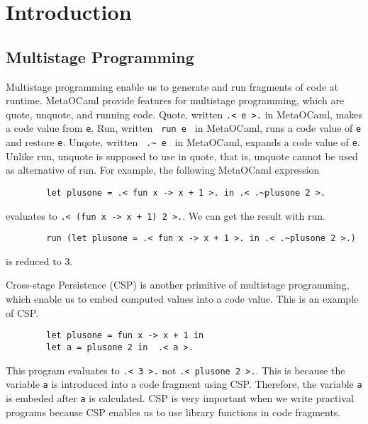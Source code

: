 \documentclass[runningheads]{llncs}
\begin{document}
\section{Introduction}

\subsection{Multistage Programming}


Multistage programming enable us to generate and run fragments of code at runtime.
MetaOCaml\cite{oleg2014} provide features for multistage programming, which are quote, unquote, and running code.
Quote, written \verb|.< e >.| in MetaOCaml, makes a code value from \verb|e|.
Run, written \verb| run e | in MetaOCaml, runs a code value of \verb|e| and restore \verb|e|.
Unqote, written \verb| .~ e | in MetaOCaml, expands a code value of \verb|e|.
Unlike run, unquote is supposed to use in quote, that is, unquote cannot be used as alternative of run.
For example, the following MetaOCaml expression

\begin{verbatim}
        let plusone = .< fun x -> x + 1 >. in .< .~plusone 2 >.
\end{verbatim}
evaluates to \verb|.< (fun x -> x + 1) 2 >.|. We can get the result with run.
\begin{verbatim}
        run (let plusone = .< fun x -> x + 1 >. in .< .~plusone 2 >.)
\end{verbatim}
is reduced to 3.


Cross-stage Persistence (CSP) is another primitive of multistage programming, which enable us to embed computed values into a code value.
This is an example of CSP.
\begin{verbatim}
        let plusone = fun x -> x + 1 in
        let a = plusone 2 in  .< a >.
\end{verbatim}
This program evaluates to \verb|.< 3 >.| not  \verb|.< plusone 2 >.|.
This is because the variable \verb|a| is introduced into a code fragment using CSP.
Therefore, the variable \verb|a| is embeded after \verb|a| is calculated.
CSP is very important when we write practival programs 
because CSP enables us to use library functions in code fragments.
\end{document}
